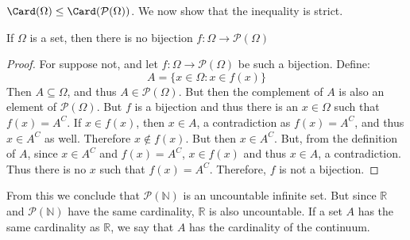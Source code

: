         $\Card(\Omega)\leq\Card(\mathcal{P}(\Omega))$. We now show
        that the inequality is strict.
        \begin{theorem}
            If $\Omega$ is a set, then there is no bijection
            $f:\Omega\rightarrow\mathcal{P}(\Omega)$
        \end{theorem}
        \begin{proof}
            For suppose not, and let
            $f:\Omega\rightarrow\mathcal{P}(\Omega)$ be such a
            bijection. Define:
            \begin{equation}
                A=\{x\in\Omega:x\in{f}(x)\}
            \end{equation}
            Then $A\subseteq\Omega$, and thus
            $A\in\mathcal{P}(\Omega)$. But then the complement of
            $A$ is also an element of $\mathcal{P}(\Omega)$. But
            $f$ is a bijection and thus there is an $x\in\Omega$
            such that $f(x)=A^{C}$. If $x\in{f}(x)$, then
            $x\in{A}$, a contradiction as $f(x)=A^{C}$, and thus
            $x\in{A}^{C}$ as well. Therefore $x\notin{f}(x)$. But
            then $x\in{A}^{C}$. But, from the definition of $A$,
            since $x\in{A}^{C}$ and $f(x)=A^{C}$, $x\in{f}(x)$
            and thus $x\in{A}$, a contradiction. Thus there is no
            $x$ such that $f(x)=A^{C}$. Therefore, $f$ is not a
            bijection.
        \end{proof}
        From this we conclude that $\mathcal{P}(\mathbb{N})$
        is an uncountable infinite set. But since $\mathbb{R}$
        and $\mathcal{P}(\mathbb{N})$ have the same cardinality,
        $\mathbb{R}$ is also uncountable.
        If a set $A$ has the same cardinality as $\mathbb{R}$,
        we say that $A$ has the cardinality of the continuum.
